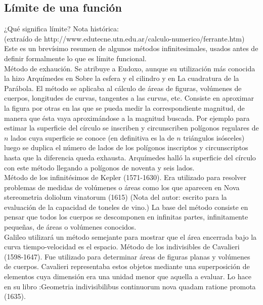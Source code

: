 \documentclass[10pt,twoside]{SelfArx} %
\begin{document}
\subsection{L\'imite de una funci\'on}



¿Qué significa límite?
Nota histórica:\\

(extraído de http://www.edutecne.utn.edu.ar/calculo-numerico/ferrante.htm)\\
Este es un brevísimo resumen de algunos métodos infinitesimales, usados antes de definir formalmente lo que es límite funcional.\\

	 Método de exhaución. Se atribuye a Eudoxo, aunque su utilización más conocida la hizo Arquímedes en Sobre la esfera y el cilindro y en La cuadratura de la Parábola. El método se aplicaba al cálculo de áreas de figuras, volúmenes de cuerpos, longitudes de curvas, tangentes a las curvas,
	etc. Consiste en aproximar la figura por otras en las que se pueda medir la correspondiente magnitud, de manera que ésta vaya aproximándose a la magnitud buscada. Por ejemplo para estimar la superficie del círculo se inscriben y circunscriben polígonos regulares de $ n $ lados cuya superficie se conoce (en definitiva es la de $ n $ triángulos isósceles) luego se duplica el número de lados de los polígonos inscriptos y circunscriptos hasta que la diferencia queda exhausta. Arquímedes halló la superficie del círculo con este método llegando a polígonos de noventa y seis lados.\\
	 Método de los infinitésimos de Kepler (1571-1630). Era utilizado para resolver problemas de medidas de volúmenes o áreas como los que aparecen en Nova stereometria doliolum vinatorum (1615) (Nota del autor: escrito para la evaluación de la capacidad de toneles de vino.) La base del método consiste en pensar que todos los cuerpos se descomponen en infinitas partes, infinitamente pequeñas, de áreas o volúmenes conocidos.\\
	Galileo utilizará un método semejante para mostrar que el área encerrada bajo la curva tiempo-velocidad es el espacio.
	Método de los indivisibles de Cavalieri (1598-1647). Fue utilizado para determinar áreas de figuras planas y volúmenes de cuerpos. Cavalieri representaba estos objetos mediante una superposición de elementos cuya dimensión era una unidad menor que aquella a evaluar. Lo hace en su libro :Geometria indivisibilibus continuorum nova quadam ratione promota (1635).\\
	
\end{document}
